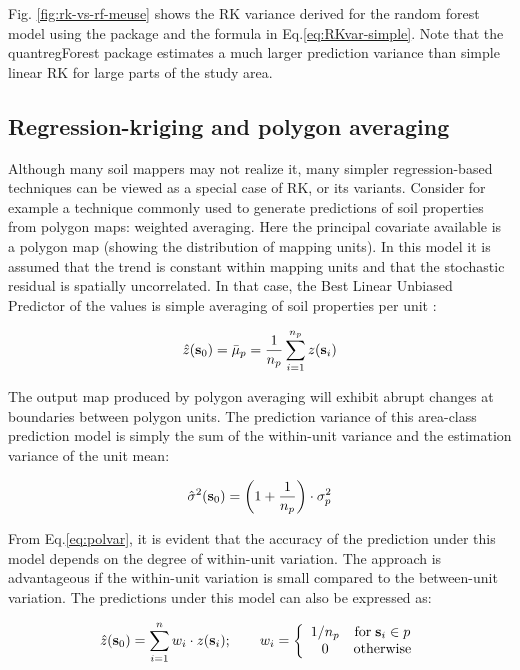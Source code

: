 \documentclass[11pt]{krantz}
\theoremstyle{definition}
\theoremstyle{definition}
\theoremstyle{definition}
\theoremstyle{remark}
\begin{document}
Fig. \ref{fig:rk-vs-rf-meuse} shows the RK variance derived for the
random forest model using the package \citep{meinshausen2006quantile}
and the formula in Eq.\eqref{eq:RKvar-simple}. Note that the
quantregForest package estimates a much larger prediction variance than
simple linear RK for large parts of the study area.

\hypertarget{regression-kriging-and-polygon-averaging}{%
\subsection{Regression-kriging and polygon
averaging}\label{regression-kriging-and-polygon-averaging}}

Although many soil mappers may not realize it, many simpler
regression-based techniques can be viewed as a special case of RK, or
its variants. Consider for example a technique commonly used to generate
predictions of soil properties from polygon maps: weighted averaging.
Here the principal covariate available is a polygon map (showing the
distribution of mapping units). In this model it is assumed that the
trend is constant within mapping units and that the stochastic residual
is spatially uncorrelated. In that case, the Best Linear Unbiased
Predictor of the values is simple averaging of soil properties per unit
\citep[ p.43]{Webster2001Wiley}:

\begin{equation}
\hat z({\bf{s}}_0 ) = \bar \mu _p  = \frac{1}{{n_p }}\sum\limits_{i = 1}^{n_p } {z({\bf{s}}_i )}
\label{eq:regavg}
\end{equation}

The output map produced by polygon averaging will exhibit abrupt changes
at boundaries between polygon units. The prediction variance of this
area-class prediction model is simply the sum of the within-unit
variance and the estimation variance of the unit mean:

\begin{equation}
\hat \sigma^2 ({\bf{s}}_0 ) = \left( 1 + \frac{1}{n_p } \right) \cdot \sigma _p^2
\label{eq:polvar}
\end{equation}

From Eq.\eqref{eq:polvar}, it is evident that the accuracy of the
prediction under this model depends on the degree of within-unit
variation. The approach is advantageous if the within-unit variation is
small compared to the between-unit variation. The predictions under this
model can also be expressed as:

\begin{equation}
\hat z({\bf{s}}_0 ) = \sum\limits_{i = 1}^n {w_i  \cdot z({\bf{s}}_i)}; \qquad w_i  = \left\{ {\begin{array}{*{20}c}
   {1/n_p } & {{\rm for} \; {\bf{s}}_i \in p}  \\
   0 & {{\rm otherwise}}  \\
 \end{array} } \right.
\end{equation}
\end{document}
